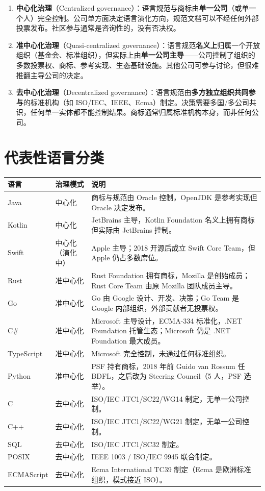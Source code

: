 \documentclass[12pt,a4paper,fontset=fandol]{ctexbook}
\begin{document}
\begin{enumerate}
  \item \textbf{中心化治理}（Centralized governance）：语言规范与商标由\textbf{单一公司}（或单一个人）完全控制。公司单方面决定语言演化方向，规范文档可以不经任何外部投票发布。社区参与通常是咨询性的，没有否决权。

  \item \textbf{准中心化治理}（Quasi-centralized governance）：语言规范\textbf{名义上}归属一个开放组织（基金会、标准组织），但实际上由\textbf{单一公司主导}——公司控制了组织的多数投票权、商标、参考实现、生态基础设施。其他公司可参与讨论，但很难推翻主导公司的决定。

  \item \textbf{去中心化治理}（Decentralized governance）：语言规范由\textbf{多方独立组织共同参与}的标准机构（如 ISO/IEC、IEEE、Ecma）制定。决策需要多国/多公司共识，任何单一实体都不能控制结果。商标通常归属标准机构本身，而非任何公司。
\end{enumerate}

\section{代表性语言分类}

\begin{center}
\small
\begin{tabularx}{\textwidth}{@{}l l X@{}}
\toprule
\textbf{语言} & \textbf{治理模式} & \textbf{说明} \\
\midrule
Java & 中心化 & 商标与规范由 Oracle 控制，OpenJDK 是参考实现但 Oracle 决定发布。 \\
Kotlin & 中心化 & JetBrains 主导，Kotlin Foundation 名义上拥有商标但实际由 JetBrains 控制。 \\
Swift & 中心化（演化中） & Apple 主导；2018 开源后成立 Swift Core Team，但 Apple 仍占多数席位。 \\
Rust & 准中心化 & Rust Foundation 拥有商标，Mozilla 是创始成员；Rust Core Team 由原 Mozilla 团队成员主导。 \\
Go & 准中心化 & Go 由 Google 设计、开发、决策；Go Team 是 Google 内部组织，外部贡献者无投票权。 \\
C\# & 准中心化 & Microsoft 主导设计，ECMA-334 标准化，.NET Foundation 托管生态；Microsoft 仍是 .NET Foundation 最大成员。 \\
TypeScript & 准中心化 & Microsoft 完全控制，未通过任何标准组织。 \\
Python & 准中心化 & PSF 持有商标，2018 年前 Guido van Rossum 任 BDFL，之后改为 Steering Council（5 人，PSF 选举）。 \\
C & 去中心化 & ISO/IEC JTC1/SC22/WG14 制定，无单一公司控制。 \\
C++ & 去中心化 & ISO/IEC JTC1/SC22/WG21 制定，无单一公司控制。 \\
SQL & 去中心化 & ISO/IEC JTC1/SC32 制定。 \\
POSIX & 去中心化 & IEEE 1003 / ISO/IEC 9945 联合制定。 \\
ECMAScript & 去中心化 & Ecma International TC39 制定（Ecma 是欧洲标准组织，模式接近 ISO）。 \\
\bottomrule
\end{tabularx}
\end{center}
\end{document}
